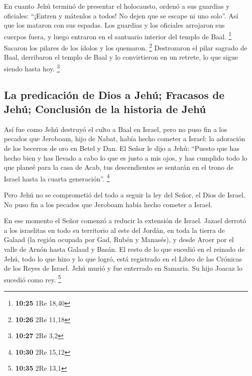  En cuanto Jehú terminó de presentar el holocausto,
ordenó a sus guardias y oficiales: ``¡Entren y mátenlos a todos! No
dejen que se escape ni uno solo''. Así que los mataron con sus espadas.
Los guardias y los oficiales arrojaron sus cuerpos fuera, y luego
entraron en el santuario interior del templo de Baal. \footnote{\textbf{10:25}
  1Re 18,40}  Sacaron los pilares de los ídolos y los
quemaron. \footnote{\textbf{10:26} 2Re 11,18} 
Destrozaron el pilar sagrado de Baal, derribaron el templo de Baal y lo
convirtieron en un retrete, lo que sigue siendo hasta hoy. \footnote{\textbf{10:27}
  2Re 3,2}

\hypertarget{la-predicaciuxf3n-de-dios-a-jehuxfa-fracasos-de-jehuxfa-conclusiuxf3n-de-la-historia-de-jehuxfa}{%
\subsection{La predicación de Dios a Jehú; Fracasos de Jehú; Conclusión
de la historia de
Jehú}\label{la-predicaciuxf3n-de-dios-a-jehuxfa-fracasos-de-jehuxfa-conclusiuxf3n-de-la-historia-de-jehuxfa}}

 Así fue como Jehú destruyó el culto a Baal en Israel,
 pero no puso fin a los pecados que Jeroboam, hijo de
Nabat, había hecho cometer a Israel: la adoración de los becerros de oro
en Betel y Dan.  El Señor le dijo a Jehú: ``Puesto que
has hecho bien y has llevado a cabo lo que es justo a mis ojos, y has
cumplido todo lo que planeé para la casa de Acab, tus descendientes se
sentarán en el trono de Israel hasta la cuarta generación''. \footnote{\textbf{10:30}
  2Re 15,12}

 Pero Jehú no se comprometió del todo a seguir la ley del
Señor, el Dios de Israel. No puso fin a los pecados que Jeroboam había
hecho cometer a Israel.

 En ese momento el Señor comenzó a reducir la extensión
de Israel. Jazael derrotó a los israelitas en todo su territorio
 al este del Jordán, en toda la tierra de Galaad (la
región ocupada por Gad, Rubén y Manasés), y desde Aroer por el valle de
Arnón hasta Galaad y Basán.  El resto de lo que sucedió
en el reinado de Jehú, todo lo que hizo y lo que logró, está registrado
en el Libro de las Crónicas de los Reyes de Israel.  Jehú
murió y fue enterrado en Samaria. Su hijo Joacaz lo sucedió como rey.
\footnote{\textbf{10:35} 2Re 13,1}

